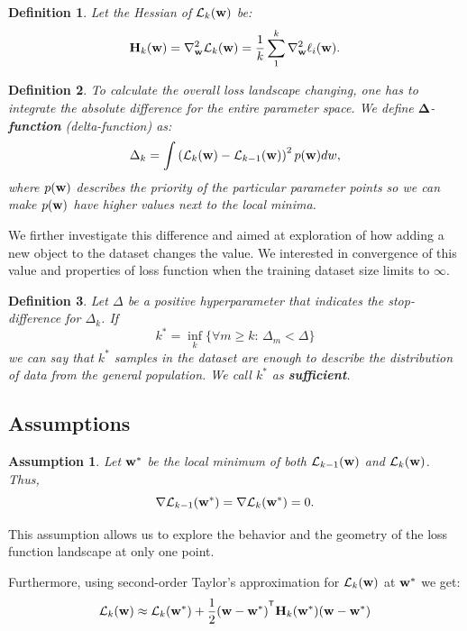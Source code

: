 \documentclass{article}
\newtheorem{definition}{Definition}
\newtheorem{assumption}{Assumption}
\begin{document}
\begin{definition}
  Let the Hessian of $\mathcal{L}_k(\mathbf{w})$ be:
  $$\mathbf{H}_k(\mathbf{w}) = \nabla^2_{\mathbf{w}}\mathcal{L}_k(\mathbf{w}) = \frac1k \sum\limits_1^k \nabla^2_{\mathbf{w}} \ell_i(\mathbf{w}).$$
\end{definition}

\begin{definition}
  To calculate the overall loss landscape changing, one has to integrate the absolute difference for the entire parameter space.
  We define $\mathbf{\Delta}$-\textbf{function} (delta-function) as:
  $$\Delta_{k} = \int \left( \mathcal{L}_{k}(\mathbf{w}) - \mathcal{L}_{k-1}(\mathbf{w}) \right)^2 p(\mathbf{w}) dw,$$
  where $p(\mathbf{w})$ describes the priority of the particular parameter points so we can make $p(\mathbf{w})$ have higher values
  next to the local minima.
\end{definition}

We firther investigate this difference and aimed at exploration of how adding a new object to the dataset changes the value.
We interested in convergence of this value and properties of loss function when the training dataset size limits to $\infty$.

\begin{definition}
  Let $\Delta$ be a positive hyperparameter that indicates the stop-difference for $\Delta_k$. If
  $$k^* = \inf\limits_k\{\forall m \geq k: \, \Delta_m < \Delta\}$$
  we can say that $k^*$ samples in the dataset are enough to describe the distribution of data from the general population.
  We call $k^*$ as \textbf{sufficient}.
\end{definition}

\subsection{Assumptions}

\begin{assumption}
  Let $\mathbf{w}^*$ be the local minimum of both $\mathcal{L}_{k-1}(\mathbf{w})$ and $\mathcal{L}_{k}(\mathbf{w})$.
  Thus, $$\nabla \mathcal{L}_{k-1}(\mathbf{w}^*) = \nabla \mathcal{L}_{k}(\mathbf{w}^*) = 0.$$
\end{assumption}

This assumption allows us to explore the behavior and the geometry of the loss function landscape at only one point.

Furthermore, using second-order Taylor's approximation for $\mathcal{L}_{k}(\mathbf{w})$ at $\mathbf{w}^*$ we get:
$$\mathcal{L}_{k}(\bw) \approx \mathcal{L}_{k}(\bw^*) + \frac12 (\bw - \bw^*)^{\T} \bH_k(\bw^*)
  (\bw - \bw^*)$$
\end{document}

